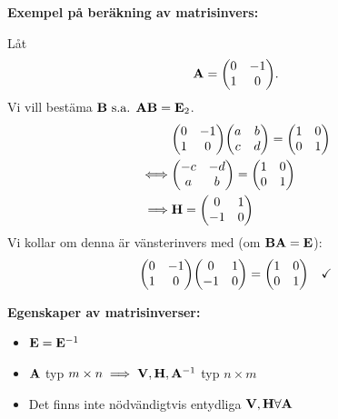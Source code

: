 \begin{ber}
	\textbf{Exempel på beräkning av matrisinvers:}

	Låt
	$$
		\mathbf{A}=\qty(\begin{matrix}
			0&-1\\
			1&0
		\end{matrix}).
	$$
	Vi vill bestäma $\mathbf{B}\text{ s.a. }\mathbf{A}\mathbf{B}=\mathbf{E}_2$.
	\begin{align*}
		&\qty(\begin{matrix}
			0&-1\\
			1&0
		\end{matrix})\qty(\begin{matrix}
			a&b\\
			c&d
		\end{matrix})=\qty(\begin{matrix}
			1&0\\
			0&1
		\end{matrix})\\
		\iff&\qty(\begin{matrix}
			-c&-d\\a&b
		\end{matrix})=\qty(\begin{matrix}
			1&0\\0&1
		\end{matrix})\\
		\implies&\mathbf{H}=\qty(\begin{matrix}
			0&1\\
			-1&0
		\end{matrix})
	\end{align*}
	Vi kollar om denna är vänsterinvers med (om $\mathbf{B}\mathbf{A}=\mathbf{E}$):
	\begin{align*}
		\qty(\begin{matrix}
			0&-1\\
			1&0
		\end{matrix})\qty(\begin{matrix}
			0&1\\
			-1&0
		\end{matrix})=\qty(\begin{matrix}
			1&0\\
			0&1
		\end{matrix})\quad\checkmark
	\end{align*}
\end{ber}

\begin{features}
	\textbf{Egenskaper av matrisinverser:}

	\begin{itemize}
		\item $\mathbf{E}=\mathbf{E}^{-1}$
		\item $\mathbf{A}$ typ $m\times n\implies\mathbf{V},\mathbf{H},\mathbf{A}^{-1}$ typ $n\times m$
		\item Det finns inte nödvändigtvis entydliga $\mathbf{V},\mathbf{H}\forall\mathbf{A}$
	\end{itemize}
\end{features}

